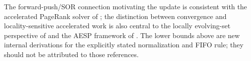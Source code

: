The forward-push/SOR connection motivating the update is consistent with the
accelerated PageRank solver of \citet{chen2023accelerating}; the distinction
between convergence and locality-sensitive accelerated work is also central
to the locally evolving-set perspective of
\citet{zhou2024iterative} and the AESP framework of
\citet{huang2025accelerated}.  The lower bounds above are new internal
derivations for the explicitly stated normalization and FIFO rule; they should
not be attributed to those references.

